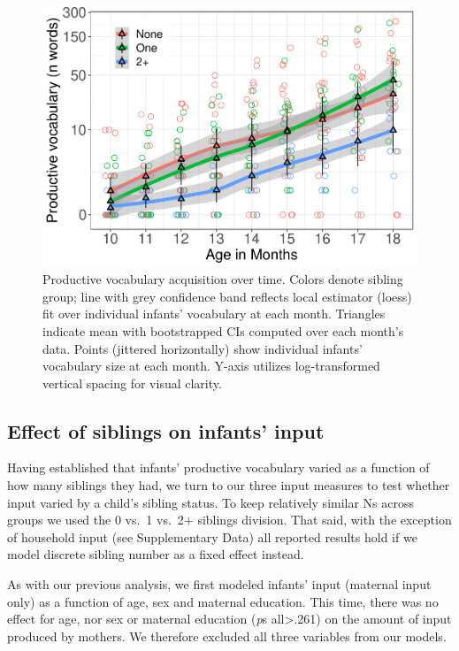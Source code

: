 \documentclass[
  english,
  man,floatsintext]{apa6}
\begin{document}
\begin{figure}
\centering
\includegraphics{SiblingsStudyText_files/figure-latex/Figure-SibGroup-1.pdf}
\caption{\label{fig:Figure-SibGroup}Productive vocabulary acquisition over time. Colors denote sibling group; line with grey confidence band reflects local estimator (loess) fit over individual infants' vocabulary at each month. Triangles indicate mean with bootstrapped CIs computed over each month's data. Points (jittered horizontally) show individual infants' vocabulary size at each month. Y-axis utilizes log-transformed vertical spacing for visual clarity.}
\end{figure}

\hypertarget{effect-of-siblings-on-infants-input}{%
\subsection{Effect of siblings on infants' input}\label{effect-of-siblings-on-infants-input}}

Having established that infants' productive vocabulary varied as a function of how many siblings they had, we turn to our three input measures to test whether input varied by a child's sibling status. To keep relatively similar Ns across groups we used the 0 vs.~1 vs.~2+ siblings division. That said, with the exception of household input (see Supplementary Data) all reported results hold if we model discrete sibling number as a fixed effect instead.

As with our previous analysis, we first modeled infants' input (maternal input only) as a function of age, sex and maternal education. This time, there was no effect for age, nor sex or maternal education (\emph{p}s all\textgreater.261) on the amount of input produced by mothers. We therefore excluded all three variables from our models.
\end{document}
